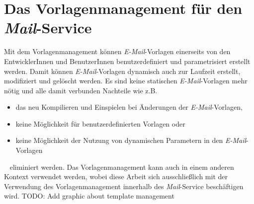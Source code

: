\section{Das Vorlagenmanagement für den \emph{Mail}-Service}
Mit dem Vorlagenmanagement können \emph{E-Mail}-Vorlagen einerseits von den EntwicklerInnen und BenutzerInnen benutzerdefiniert und parametrisiert erstellt werden. Damit können \emph{E-Mail}-Vorlagen dynamisch auch zur Laufzeit erstellt, modifiziert und gelöscht werden. Es sind keine statischen \emph{E-Mail}-Vorlagen mehr nötig und alle damit verbunden Nachteile wie z.B. 
\begin{itemize}
	\item das neu Kompilieren und Einspielen bei Änderungen der \emph{E-Mail}-Vorlagen,
	\item keine Möglichkeit für benutzerdefinierten Vorlagen oder
	\item keine Möglichkeit der Nutzung von dynamischen Parametern in den \emph{E-Mail}-Vorlagen
\end{itemize}
\ \newline
eliminiert werden. Das Vorlagenmanagement kann auch in einem anderen Kontext verwendet werden, wobei diese Arbeit sich  ausschließlich mit der Verwendung des Vorlagenmanagement innerhalb des \emph{Mail}-Service beschäftigen wird. 
\newline
TODO: Add graphic about template management
\newline

